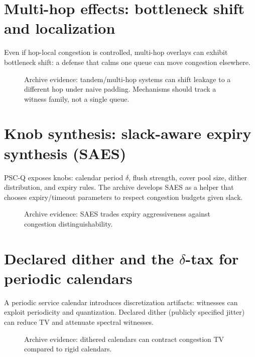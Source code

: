 \documentclass[11pt]{article}
\theoremstyle{definition}
\theoremstyle{remark}
\begin{document}
\section{Multi-hop effects: bottleneck shift and localization}
Even if hop-local congestion is controlled, multi-hop overlays can exhibit bottleneck shift: a defense that calms one queue can move congestion elsewhere.

\begin{figure}[t]
\centering
{}
\caption{Archive evidence: tandem/multi-hop systems can shift leakage to a different hop under naive padding. Mechanisms should track a witness family, not a single queue.}
\label{fig:tandem}
\end{figure}

\section{Knob synthesis: slack-aware expiry synthesis (SAES)}
PSC-Q exposes knobs: calendar period $\delta$, flush strength, cover pool size, dither distribution, and expiry rules.
The archive develops SAES as a helper that chooses expiry/timeout parameters to respect congestion budgets given slack.

\begin{figure}[t]
\centering
{}
\caption{Archive evidence: SAES trades expiry aggressiveness against congestion distinguishability.}
\label{fig:saes}
\end{figure}

\section{Declared dither and the \texorpdfstring{$\delta$}{delta}-tax for periodic calendars}
A periodic service calendar introduces discretization artifacts: witnesses can exploit periodicity and quantization.
Declared dither (publicly specified jitter) can reduce TV and attenuate spectral witnesses.

\begin{figure}[t]
\centering
{}
\caption{Archive evidence: dithered calendars can contract congestion TV compared to rigid calendars.}
\label{fig:dither}
\end{figure}
\end{document}

